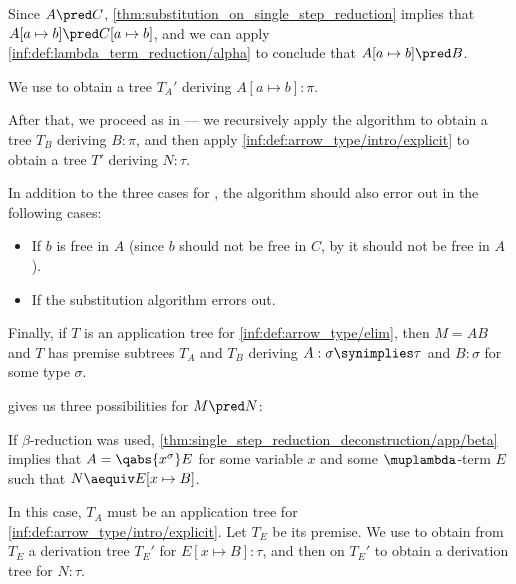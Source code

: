 \begin{algorithm}
\begin{thmenum}
\begin{thmenum}
\begin{thmenum}
        Since \( A \pred C \), \cref{thm:substitution_on_single_step_reduction} implies that \( A[a \mapsto b] \pred C[a \mapsto b] \), and we can apply \ref{inf:def:lambda_term_reduction/alpha} to conclude that \( A[a \mapsto b] \pred B \).

        We use  to obtain a tree \( T_A' \) deriving \( A[a \mapsto b]: \pi \).

        After that, we proceed as in  --- we recursively apply the algorithm to obtain a tree \( T_B \) deriving \( B: \pi \), and then apply \ref{inf:def:arrow_type/intro/explicit} to obtain a tree \( T' \) deriving \( N: \tau \).

        In addition to the three cases for , the algorithm should also error out in the following cases:
        \begin{itemize}
          \item If \( b \) is free in \( A \) (since \( b \) should not be free in \( C \), by  it should not be free in \( A \)).
          \item If the substitution algorithm errors out.
        \end{itemize}
      \end{thmenum}
    \end{thmenum}

     Finally, if \( T \) is an application tree for \ref{inf:def:arrow_type/elim}, then \( M = AB \) and \( T \) has premise subtrees \( T_A \) and \( T_B \) deriving \( A: \sigma \synimplies \tau \) and \( B: \sigma \) for some type \( \sigma \).

     gives us three possibilities for \( M \pred N \):
    \begin{thmenum}
       If \( \beta \)-reduction was used, \cref{thm:single_step_reduction_deconstruction/app/beta} implies that \( A = \qabs {x^\sigma} E \) for some variable \( x \) and some \( \muplambda \)-term \( E \) such that \( N \aequiv E[x \mapsto B] \).

      In this case, \( T_A \) must be an application tree for \ref{inf:def:arrow_type/intro/explicit}. Let \( T_E \) be its premise. We use  to obtain from \( T_E \) a derivation tree \( T_E' \) for \( E[x \mapsto B]: \tau \), and then  on \( T_E' \) to obtain a derivation tree for \( N: \tau \).


\end{thmenum}
\end{thmenum}
\end{algorithm}
